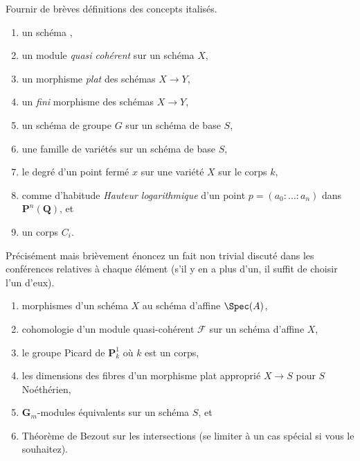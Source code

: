\begin{exercise}[Definitions]
\label{exercise-definitions-spring-2022}
Fournir de brèves définitions des concepts italisés.
\begin{enumerate}
\item un schéma {\it},
\item un module {\it quasi cohérent} sur un schéma $X$,
\item un morphisme {\it plat} des schémas $X \to Y$,
\item un {\it fini} morphisme des schémas $X \to Y$,
\item un schéma de groupe {\it} $G$ sur un schéma de base $S$,
\item une famille de variétés {\it } sur un schéma de base $S$,
\item le degré {\it} d'un point fermé $x$ sur une variété $X$
sur le corps $k$,
\item comme d'habitude {\it Hauteur logarithmique} d'un point
$p = (a_0 : \ldots : a_n)$ dans $\mathbf{P}^n(\mathbf{Q})$, et
\item un corps {\it $C_i$}.
\end{enumerate}
\end{exercise}

\begin{exercise}[Theorems]
\label{exercise-results-spring-2022}
Précisément mais brièvement énoncez un fait non trivial discuté dans les conférences relatives à
chaque élément (s'il y en a plus d'un, il suffit de choisir
l'un d'eux).
\begin{enumerate}
\item morphismes d'un schéma $X$ au schéma d'affine $\Spec(A)$,
\item cohomologie d'un module quasi-cohérent $\mathcal{F}$ sur un
schéma d'affine $X$,
\item le groupe Picard de $\mathbf{P}^1_k$ où $k$ est un corps,
\item les dimensions des fibres d'un morphisme plat approprié $X
\to S$ pour $S$ Noéthérien,
\item $\mathbf{G}_m$-modules équivalents sur un schéma $S$, et
\item Théorème de Bezout sur les intersections (se limiter à un
cas spécial si vous le souhaitez).
\end{enumerate}
\end{exercise}

